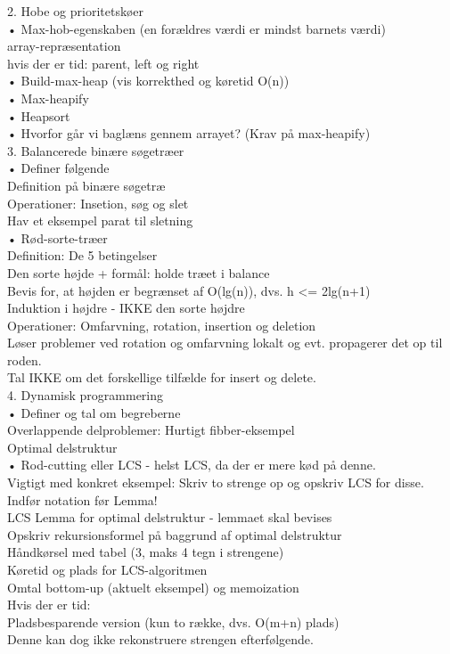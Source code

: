 \documentclass[11pt,a4paper]{report}
\theoremstyle{plain}
\theoremstyle{definition}
\theoremstyle{remark}
\numberwithin{equation}{section}
\begin{document}
2. Hobe og prioritetskøer\\
 • Max-hob-egenskaben (en forældres værdi er mindst barnets værdi)\\
 	array-repræsentation\\
 	hvis der er tid: parent, left og right\\
 • Build-max-heap (vis korrekthed og køretid O(n))\\
 • Max-heapify\\
 • Heapsort\\
 • Hvorfor går vi baglæns gennem arrayet? (Krav på max-heapify)\\

3. Balancerede binære søgetræer\\
 • Definer følgende\\
 	Definition på binære søgetræ\\
 	Operationer: Insetion, søg og slet\\
 		Hav et eksempel parat til sletning\\
 • Rød-sorte-træer\\
 	Definition: De 5 betingelser\\
 		Den sorte højde + formål: holde træet i balance\\
 	Bevis for, at højden er begrænset af O(lg(n)), dvs. h <= 2lg(n+1)\\
 		Induktion i højdre - IKKE den sorte højdre\\
 	Operationer: Omfarvning, rotation, insertion og deletion\\
 		Løser problemer ved rotation og omfarvning lokalt og evt. propagerer det op til roden.\\
 		Tal IKKE om det forskellige tilfælde for insert og delete.\\

4. Dynamisk programmering\\
 • Definer og tal om begreberne\\
 	Overlappende delproblemer: Hurtigt fibber-eksempel\\
 	Optimal delstruktur\\
 • Rod-cutting eller LCS - helst LCS, da der er mere kød på denne.\\
 	Vigtigt med konkret eksempel: Skriv to strenge op og opskriv LCS for disse.\\
 	Indfør notation før Lemma!\\
 	LCS Lemma for optimal delstruktur - lemmaet skal bevises\\
 	Opskriv rekursionsformel på baggrund af optimal delstruktur\\
 	Håndkørsel med tabel (3, maks 4 tegn i strengene)\\
 	Køretid og plads for LCS-algoritmen\\
 	Omtal bottom-up (aktuelt eksempel) og memoization\\
 	Hvis der er tid:\\
 		Pladsbesparende version (kun to række, dvs. O(m+n) plads)\\
 		Denne kan dog ikke rekonstruere strengen efterfølgende.\\
\end{document}
